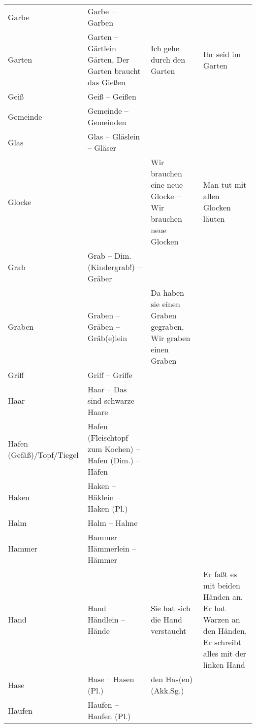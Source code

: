 {\begin{xltabular}{\textwidth}{>{\raggedright\arraybackslash}p{.15\textwidth}QQQ}
Garbe & Garbe -- Garben &  & \\
Garten & Garten -- Gärtlein -- Gärten, Der Garten braucht das Gießen & Ich gehe durch den Garten & Ihr seid im Garten\\
Geiß & Geiß -- Geißen &  & \\
Gemeinde & Gemeinde -- Gemeinden &  & \\
Glas & Glas -- Gläslein -- Gläser &  & \\
Glocke &  & Wir brauchen eine neue Glocke -- Wir brauchen neue Glocken & Man tut mit allen Glocken läuten\\
Grab & Grab -- Dim. (Kindergrab!) -- Gräber &  & \\
Graben & Graben -- Gräben -- Gräb(e)lein & Da haben sie einen Graben gegraben, Wir graben einen Graben & \\
Griff & Griff -- Griffe &  & \\
Haar & Haar -- Das sind schwarze Haare &  & \\
Hafen (Gefäß)\slash Topf\slash Tiegel & Hafen (Fleischtopf zum Kochen) -- Hafen (Dim.) -- Häfen &  & \\
Haken & Haken -- Häklein -- Haken (Pl.) &  & \\
Halm & Halm -- Halme &  & \\
Hammer & Hammer -- Hämmerlein -- Hämmer &  & \\
Hand & Hand -- Händlein -- Hände & Sie hat sich die Hand verstaucht & Er faßt es mit beiden Händen an, Er hat Warzen an den Händen, Er schreibt alles mit der linken Hand\\
Hase & Hase -- Hasen (Pl.) & den Has(en) (Akk.Sg.) & \\
Haufen & Haufen -- Haufen (Pl.)


\end{xltabular}}
